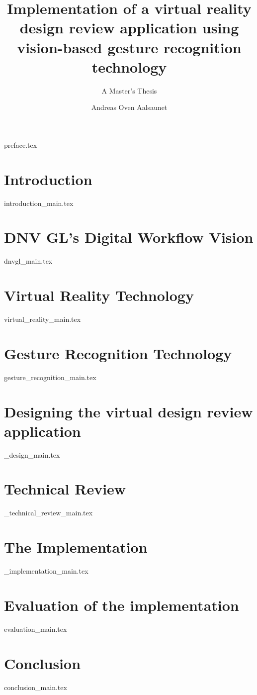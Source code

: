 \documentclass[UKenglish]{ifimaster}
\title{Implementation of a virtual reality design review application using vision-based gesture recognition technology}
\subtitle{A Master's Thesis}
\author{Andreas Oven Aalsaunet}
\begin{document}
\duoforside[dept={Department of Informatics}, program={Programming and Networks}, long]                                        

{preface.tex}

\frontmatter{}                 
\tableofcontents{}
\listoffigures{}
\listoftables{}

\mainmatter{}
  
\chapter{Introduction}  
\label{chapter:introduction}
{introduction_main.tex}

\chapter{DNV GL's Digital Workflow Vision}
\label{chapter:dnvgl}
{dnvgl_main.tex}

\chapter{Virtual Reality Technology}
\label{chapter:vr}
{virtual_reality_main.tex}

\chapter{Gesture Recognition Technology}
\label{chapter:grt}
{gesture_recognition_main.tex}

\chapter{Designing the virtual design review application}
\label{chapter:design}
{_design_main.tex}

\chapter{Technical Review}
\label{chapter:technical}
{_technical_review_main.tex}

\chapter{The Implementation}
\label{chapter:implementation}
{_implementation_main.tex}

\chapter{Evaluation of the implementation}
\label{chapter:evaluation}
{evaluation_main.tex}

\chapter{Conclusion}
\label{chapter:conclusion}
{conclusion_main.tex}

\backmatter{}


\end{document}
